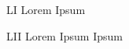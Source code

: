 \begin{KeepFromToc} %
\listoffigures



\cleardoublepage


\listoftables
\cleardoublepage

\listofquadros
\cleardoublepage

\makeatletter
\let\l@listing\l@figure
\def\newfloat@listoflisting@hook{\let\figurename\listingname}
\makeatother

\listoflistings

\end{KeepFromToc}

\begin{siglas}
	\item[LI]       Lorem Ipsum
    \item[LII]		Lorem Ipsum Ipsum

\end{siglas}

\tableofcontents*
\cleardoublepage


